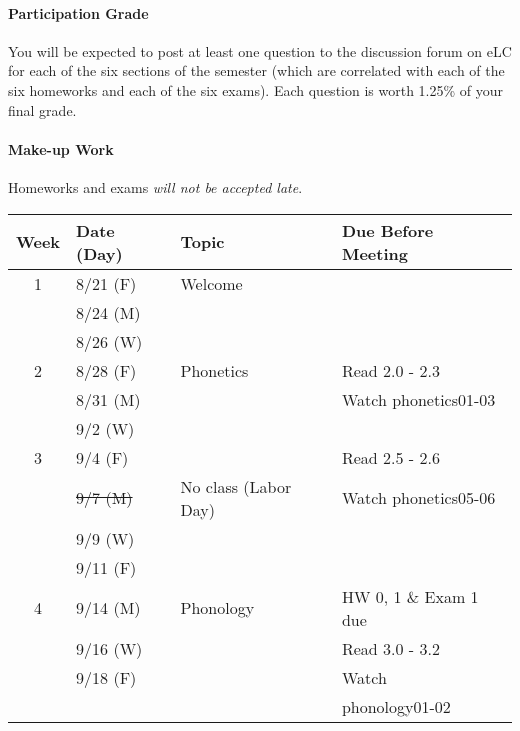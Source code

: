 \documentclass{article}
\begin{document}
  \paragraph{Participation Grade}
    You will be expected to post at least one question to the discussion forum on eLC for each of the six sections of the semester (which are correlated with each of the six homeworks and each of the six exams). Each question is worth 1.25\% of your final grade.

  \paragraph{Make-up Work}
    Homeworks and exams \emph{will not be accepted late}.

    \begin{longtable}{c l l | l}
      Week  & Date (Day)  & Topic                           & Due Before Meeting \\
      \hline
      \hline
      1     & 8/21 (F)    & Welcome                         & \\
            & 8/24 (M)    &                                 & \\
            & 8/26 (W)    &                                 & \\
      \hline
      2     & 8/28 (F)    & Phonetics                       & Read 2.0 - 2.3\\
            & 8/31 (M)    &                                 & Watch phonetics01-03\\
            & 9/2  (W)    &                                 & \\
      \hline
      3     & 9/4  (F)    &                                 & Read 2.5 - 2.6\\
            & \sout{9/7  (M)} & No class (Labor Day)        & Watch phonetics05-06\\
            & 9/9  (W)    &                                 & \\
            & 9/11 (F)    &                                 & \\
      \hline
      4     & 9/14 (M)    & Phonology                       & HW 0, 1 \& Exam 1 due\\
            & 9/16 (W)    &                                 & Read 3.0 - 3.2\\
            & 9/18 (F)    &                                 & Watch\\
            &             &                                 & phonology01-02\\

\end{longtable}
\end{document}
